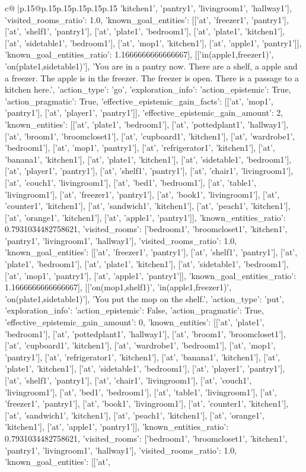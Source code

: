 \documentclass{article}
\begin{document}
{\begin{supertabular}{c@{$\;$}|p{.15\linewidth}@{}p{.15\linewidth}p{.15\linewidth}p{.15\linewidth}p{.15\linewidth}p{.15\linewidth}}
{{{'kitchen1', 'pantry1', 'livingroom1', 'hallway1'], 'visited_rooms_ratio': 1.0, 'known_goal_entities': [['at', 'freezer1', 'pantry1'], ['at', 'shelf1', 'pantry1'], ['at', 'plate1', 'bedroom1'], ['at', 'plate1', 'kitchen1'], ['at', 'sidetable1', 'bedroom1'], ['at', 'mop1', 'kitchen1'], ['at', 'apple1', 'pantry1']], 'known_goal_entities_ratio': 1.1666666666666667}}], [['in(apple1,freezer1)', 'on(plate1,sidetable1)'], 'You are in a pantry now. There are a shelf, a apple and a freezer. The apple is in the freezer. The freezer is open. There is a passage to a kitchen here.', {'action_type': 'go', 'exploration_info': {'action_epistemic': True, 'action_pragmatic': True, 'effective_epistemic_gain_facts': [['at', 'mop1', 'pantry1'], ['at', 'player1', 'pantry1']], 'effective_epistemic_gain_amount': 2, 'known_entities': [['at', 'plate1', 'bedroom1'], ['at', 'pottedplant1', 'hallway1'], ['at', 'broom1', 'broomcloset1'], ['at', 'cupboard1', 'kitchen1'], ['at', 'wardrobe1', 'bedroom1'], ['at', 'mop1', 'pantry1'], ['at', 'refrigerator1', 'kitchen1'], ['at', 'banana1', 'kitchen1'], ['at', 'plate1', 'kitchen1'], ['at', 'sidetable1', 'bedroom1'], ['at', 'player1', 'pantry1'], ['at', 'shelf1', 'pantry1'], ['at', 'chair1', 'livingroom1'], ['at', 'couch1', 'livingroom1'], ['at', 'bed1', 'bedroom1'], ['at', 'table1', 'livingroom1'], ['at', 'freezer1', 'pantry1'], ['at', 'book1', 'livingroom1'], ['at', 'counter1', 'kitchen1'], ['at', 'sandwich1', 'kitchen1'], ['at', 'peach1', 'kitchen1'], ['at', 'orange1', 'kitchen1'], ['at', 'apple1', 'pantry1']], 'known_entities_ratio': 0.7931034482758621, 'visited_rooms': ['bedroom1', 'broomcloset1', 'kitchen1', 'pantry1', 'livingroom1', 'hallway1'], 'visited_rooms_ratio': 1.0, 'known_goal_entities': [['at', 'freezer1', 'pantry1'], ['at', 'shelf1', 'pantry1'], ['at', 'plate1', 'bedroom1'], ['at', 'plate1', 'kitchen1'], ['at', 'sidetable1', 'bedroom1'], ['at', 'mop1', 'pantry1'], ['at', 'apple1', 'pantry1']], 'known_goal_entities_ratio': 1.1666666666666667}}], [['on(mop1,shelf1)', 'in(apple1,freezer1)', 'on(plate1,sidetable1)'], 'You put the mop on the shelf.', {'action_type': 'put', 'exploration_info': {'action_epistemic': False, 'action_pragmatic': True, 'effective_epistemic_gain_amount': 0, 'known_entities': [['at', 'plate1', 'bedroom1'], ['at', 'pottedplant1', 'hallway1'], ['at', 'broom1', 'broomcloset1'], ['at', 'cupboard1', 'kitchen1'], ['at', 'wardrobe1', 'bedroom1'], ['at', 'mop1', 'pantry1'], ['at', 'refrigerator1', 'kitchen1'], ['at', 'banana1', 'kitchen1'], ['at', 'plate1', 'kitchen1'], ['at', 'sidetable1', 'bedroom1'], ['at', 'player1', 'pantry1'], ['at', 'shelf1', 'pantry1'], ['at', 'chair1', 'livingroom1'], ['at', 'couch1', 'livingroom1'], ['at', 'bed1', 'bedroom1'], ['at', 'table1', 'livingroom1'], ['at', 'freezer1', 'pantry1'], ['at', 'book1', 'livingroom1'], ['at', 'counter1', 'kitchen1'], ['at', 'sandwich1', 'kitchen1'], ['at', 'peach1', 'kitchen1'], ['at', 'orange1', 'kitchen1'], ['at', 'apple1', 'pantry1']], 'known_entities_ratio': 0.7931034482758621, 'visited_rooms': ['bedroom1', 'broomcloset1', 'kitchen1', 'pantry1', 'livingroom1', 'hallway1'], 'visited_rooms_ratio': 1.0, 'known_goal_entities': [['at', }}}
\end{supertabular}}
\end{document}
